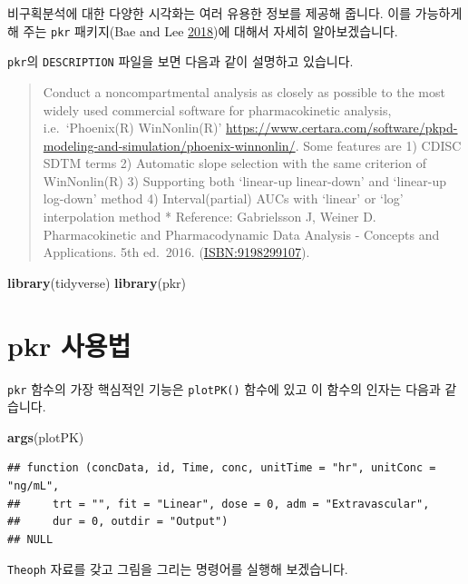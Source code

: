 \documentclass[
  12pt,
]{krantz}
\newenvironment{Shaded}{\begin{snugshade}}{\end{snugshade}}
\newcommand{\KeywordTok}[1]{\textcolor[rgb]{0.13,0.29,0.53}{\textbf{#1}}}
\newcommand{\NormalTok}[1]{#1}
\begin{document}
비구획분석에 대한 다양한 시각화는 여러 유용한 정보를 제공해 줍니다. 이를 가능하게 해 주는 \texttt{pkr} 패키지(Bae and Lee \protect\hyperlink{ref-R-pkr}{2018})에 대해서 자세히 알아보겠습니다.

\texttt{pkr}의 \texttt{DESCRIPTION} 파일을 보면 다음과 같이 설명하고 있습니다.

\begin{quote}
Conduct a noncompartmental analysis as closely as possible to the most widely used commercial software for pharmacokinetic analysis, i.e.~`Phoenix(R) WinNonlin(R)' \url{https://www.certara.com/software/pkpd-modeling-and-simulation/phoenix-winnonlin/}.
Some features are
1) CDISC SDTM terms
2) Automatic slope selection with the same criterion of WinNonlin(R)
3) Supporting both `linear-up linear-down' and `linear-up log-down' method
4) Interval(partial) AUCs with `linear' or `log' interpolation method
* Reference: Gabrielsson J, Weiner D. Pharmacokinetic and Pharmacodynamic Data Analysis - Concepts and Applications. 5th ed.~2016. (\url{ISBN:9198299107}).
\end{quote}

\begin{Shaded}
\begin{Highlighting}[]
\KeywordTok{library}\NormalTok{(tidyverse)}
\KeywordTok{library}\NormalTok{(pkr)}
\end{Highlighting}
\end{Shaded}

\hypertarget{pkr-manual}{%
\section{pkr 사용법}\label{pkr-manual}}

\texttt{pkr} 함수의 가장 핵심적인 기능은 \texttt{plotPK()} 함수에 있고 이 함수의 인자는 다음과 같습니다.

\begin{Shaded}
\begin{Highlighting}[]
\KeywordTok{args}\NormalTok{(plotPK)}
\end{Highlighting}
\end{Shaded}

\begin{verbatim}
## function (concData, id, Time, conc, unitTime = "hr", unitConc = "ng/mL", 
##     trt = "", fit = "Linear", dose = 0, adm = "Extravascular", 
##     dur = 0, outdir = "Output") 
## NULL
\end{verbatim}

\texttt{Theoph} 자료를 갖고 그림을 그리는 명령어를 실행해 보겠습니다.
\end{document}
